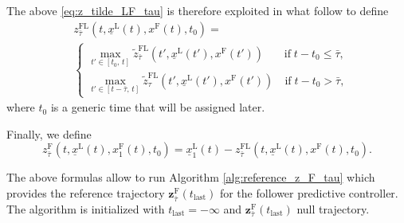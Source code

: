 \documentclass[letterpaper, 10 pt, conference]{ieeeconf}
\theoremstyle{definition}
\theoremstyle{nopoint}
\begin{document}
The above \eqref{eq:z_tilde_LF_tau} is therefore exploited in  what follow to define
\begin{equation}\label{eq:z_LF_tau}
\begin{aligned}
& z^{\mathrm{FL}}_{\bar{\tau}} (t,\underline{x}^\mathrm{L}(t),x^\mathrm{F}(t),t_0)= \\
& \begin{cases}
\max_{t' \in [t_0,\, t]} \tilde{z}^{\mathrm{FL}}_{\bar{\tau}} (t',\underline{x}^\mathrm{L}(t'),x^\mathrm{F}(t'))\quad \; \; \; \mathrm{if }\; t-t_0\leq \bar{\tau}, \\
\max_{t' \in [t-\bar{\tau},\, t]} \tilde{z}^{\mathrm{FL}}_\tau (t',\underline{x}^\mathrm{L}(t'),x^\mathrm{F}(t'))\quad \mathrm{if }\; t-t_0> \bar{\tau},
\end{cases}
\end{aligned}
\end{equation}
where $t_0$ is a generic time that will be assigned later.  

Finally, we define 
\begin{equation}\label{eq:z_F_tau}
z_{\bar{\tau}}^\mathrm{F}(t,\underline{x}^\mathrm{L}(t),x_1^\mathrm{F}(t),t_0)=\underline{x}_1^\mathrm{L}(t)-z^{\mathrm{FL}}_{\bar{\tau}} (t,\underline{x}^\mathrm{L}(t),x^\mathrm{F}(t),t_0).
\end{equation}

 
The above formulas allow to run Algorithm \ref{alg:reference_z_F_tau} which provides the reference trajectory $\mathbf{z}_{\bar{\tau}}^\mathrm{F}(t_{\mathrm{last}})$ for the follower predictive controller. The algorithm is initialized with $t_{\mathrm{last}}=-\infty$ and  $\mathbf{z}_{\bar{\tau}}^\mathrm{F}(t_{\mathrm{last}})$ null trajectory. 
 
 
\end{document}
